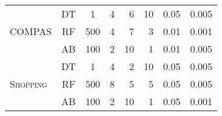\begin{table}[h]
\begin{tabular}{lcccrrrr}
\multirow{3}{*}{\textsc{COMPAS}}   & DT                   & 1                                  & 4                                  & 6  & 10 & 0.05 & 0.005       \\
                                   & RF                   & 500                                & 4                                  & 7  & 3  & 0.01 & 0.001      \\
                                   & AB                   & 100                                & 2                                  & 10 & 1  & 0.01 & 0.005	\\ \midrule
\multirow{3}{*}{\textsc{Shopping}} & DT                   & 1                                  & 4                                  & 2  & 10 & 0.05 & 0.005     \\
                                   & RF                   & 500                                & 8                                  & 5  & 5  & 0.05 & 0.005      \\
                                   & AB                   & 100                                & 2                                 & 10 & 1  & 0.05 & 0.001      \\ \bottomrule
\end{tabular}
\end{table}

\vspace{-5em}

